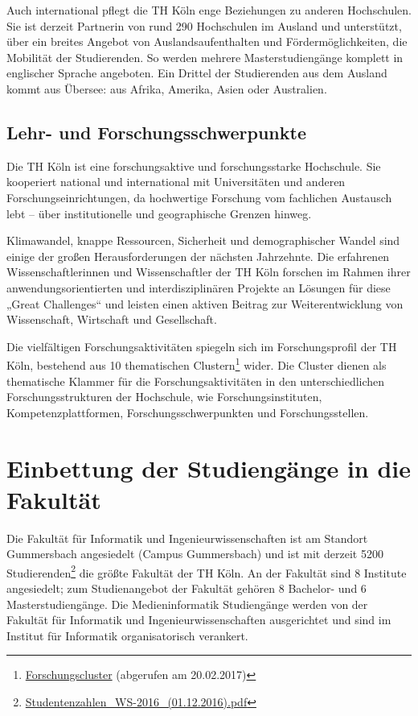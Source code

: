 Auch international pflegt die TH Köln enge Beziehungen zu anderen
Hochschulen. Sie ist derzeit Partnerin von rund 290 Hochschulen im
Ausland und unterstützt, über ein breites Angebot von
Auslandsaufenthalten und Fördermöglichkeiten, die Mobilität der
Studierenden. So werden mehrere Masterstudiengänge komplett in
englischer Sprache angeboten. Ein Drittel der Studierenden aus dem
Ausland kommt aus Übersee: aus Afrika, Amerika, Asien oder Australien.

\subsection{Lehr- und
Forschungsschwerpunkte}\label{lehr--und-forschungsschwerpunkte}

Die TH Köln ist eine forschungsaktive und forschungsstarke Hochschule.
Sie kooperiert national und international mit Universitäten und anderen
Forschungseinrichtungen, da hochwertige Forschung vom fachlichen
Austausch lebt -- über institutionelle und geographische Grenzen hinweg.

Klimawandel, knappe Ressourcen, Sicherheit und demographischer Wandel
sind einige der großen Herausforderungen der nächsten Jahrzehnte. Die
erfahrenen Wissenschaftlerinnen und Wissenschaftler der TH Köln forschen
im Rahmen ihrer anwendungsorientierten und interdisziplinären Projekte
an Lösungen für diese „Great Challenges`` und leisten einen aktiven
Beitrag zur Weiterentwicklung von Wissenschaft, Wirtschaft und
Gesellschaft.

Die vielfältigen Forschungsaktivitäten spiegeln sich im Forschungsprofil
der TH Köln, bestehend aus 10 thematischen Clustern\footnote{\href{https://www.th-koeln.de/forschung/cluster_2734.php}{Forschungscluster}
  (abgerufen am 20.02.2017)} wider. Die Cluster dienen als thematische
Klammer für die Forschungsaktivitäten in den unterschiedlichen
Forschungsstrukturen der Hochschule, wie Forschungsinstituten,
Kompetenzplattformen, Forschungsschwerpunkten und Forschungsstellen.

\section{Einbettung der Studiengänge in die
Fakultät}\label{einbettung-der-studienguxe4nge-in-die-fakultuxe4t}

Die Fakultät für Informatik und Ingenieurwissenschaften ist am Standort
Gummersbach angesiedelt (Campus Gummersbach) und ist mit derzeit 5200
Studierenden\footnote{\href{../anhaenge/Studentenzahlen_WS-2016_(01.12.2016).pdf}{Studentenzahlen\_WS-2016\_(01.12.2016).pdf}}
die größte Fakultät der TH Köln. An der Fakultät sind 8 Institute
angesiedelt; zum Studienangebot der Fakultät gehören 8 Bachelor- und 6
Masterstudiengänge. Die Medieninformatik Studiengänge werden von der
Fakultät für Informatik und Ingenieurwissenschaften ausgerichtet und
sind im Institut für Informatik organisatorisch verankert.

